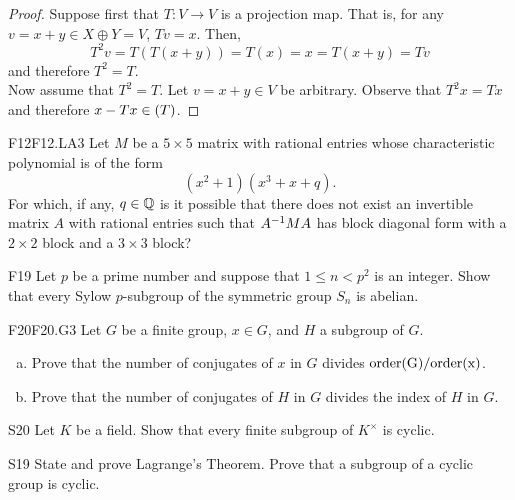 \documentclass[../AlgebraQualSolutions.tex]{subfiles}
\begin{document}
	\begin{proof}
		Suppose first that $T: V \to V$ is a projection map. That is, for any $v = x + y \in X \oplus Y = V$, $Tv = x$. Then,
			\[T^2v = T(T(x+y)) = T(x) = x = T(x+y) = Tv\]
		and therefore $T^2 = T$.\\

		Now assume that $T^2=T$. Let $v = x+y \in V$ be arbitrary. Observe that $T^2 x = Tx$ and therefore $x - Tx \in \null(T)$.
	\end{proof}
	
	\begin{prob}{F12}{F12.LA3}
	Let $M$ be a $5 \times 5$ matrix with rational entries whose characteristic polynomial is of the form
		\[(x^2+1)(x^3+x+q).\]
	For which, if any, $q \in \mathbb{Q}$ is it possible that there does not exist an invertible matrix $A$ with rational entries such that $A^{-1} M A$ has block diagonal form with a $2 \times 2$ block and a $3 \times 3$ block?
	\end{prob}
	

	
	\begin{prob}{F19}{}
	Let $p$ be a prime number and suppose that $1 \leq n <p^2$ is an integer. Show that every Sylow $p$-subgroup of the symmetric group $S_n$ is abelian.
	\end{prob}
	

	\begin{prob}{F20}{F20.G3}
	Let $G$ be a finite group, $x \in G$, and $H$ a subgroup of $G$.
	\begin{enumerate}[(a)]
	\item Prove that the number of conjugates of $x$ in $G$ divides $\rm{order}(G)/\rm{order}(x)$.
	\item Prove that the number of conjugates of $H$ in $G$ divides the index of $H$ in $G$.
	\end{enumerate}
	\end{prob}

	\begin{prob}{S20}{}
	Let $K$ be a field. Show that every finite subgroup of $K^\times$ is cyclic.
	\end{prob}

	\begin{prob}{S19}{}
	State and prove Lagrange's Theorem. Prove that a subgroup of a cyclic group is cyclic.
	\end{prob}
\end{document}
